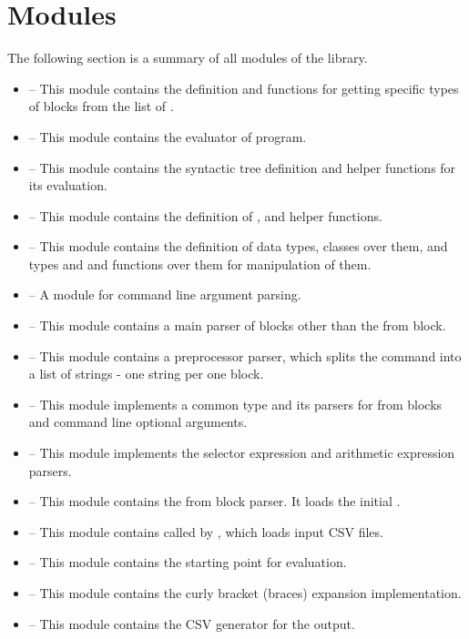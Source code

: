 \section{Modules}
The following section is a summary of all modules of the library.
\begin{itemize}
    \item {} -- This module contains the  definition and functions for getting specific types of blocks from the list of .
    \item {} -- This module contains the evaluator of  program.
    \item {} -- This module contains the syntactic tree definition and helper functions for its evaluation.
    \item {} -- This module contains the definition of ,  and helper functions.
    \item {} -- This module contains the definition of  
        data types, classes over them, and types  and  and functions over them for manipulation of them.
    \item {} -- A module for command line argument parsing.
    \item {} -- This module contains a main parser of blocks other than the from block.
    \item {} -- This module contains a preprocessor parser, which splits the command into a list of strings - one string per one block.
    \item {} -- This module implements a common  type and its parsers for from blocks and command line optional arguments.
    \item {} -- This module implements the selector expression and arithmetic expression parsers.
    \item {} -- This module contains the from block parser. It loads the initial .
    \item {} -- This module contains  called by , which loads input CSV files.
    \item {} -- This module contains the starting point for  evaluation.
    \item {} -- This module contains the curly bracket (braces) expansion implementation.
    \item {} -- This module contains the CSV generator for the output.
\end{itemize}

